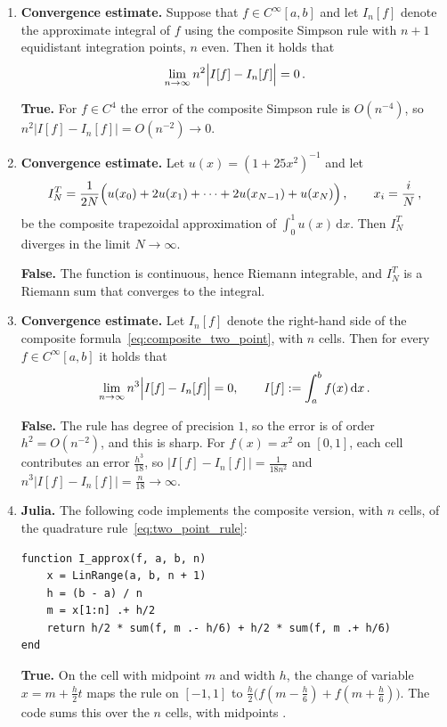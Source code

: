 \documentclass[a4paper]{article}
\renewcommand{\d}{\mathrm d}
\newcommand{\answer}[1]{%
    \ifdefined\showsolutions
        \par\smallskip
        {\small\color{blue!60!black}#1\par}
    \fi
}
\begin{document}
\begin{enumerate}
    \item
        \textbf{Convergence estimate.}
        Suppose that $f \in C^{\infty}[a, b]$ and let $I_n[f]$ denote the approximate integral of $f$ using the composite Simpson rule
        with $n+1$ equidistant integration points, $n$ even.
        Then it holds that
        \[
            \lim_{n \to \infty} n^2 \Bigl\lvert I[f] - I_n[f] \Bigr\rvert = 0\,.
        \]
        \answer{\textbf{True.}
        For $f \in C^4$ the error of the composite Simpson rule is $O(n^{-4})$, so $n^2 \lvert I[f] - I_n[f] \rvert = O(n^{-2}) \to 0$.}

    \item
        \textbf{Convergence estimate.}
        Let $u(x) = (1 + 25 x^2)^{-1}$ and let
        \[
            I^T_N = \frac{1}{2N} \Bigl( u(x_0) + 2 u(x_1) + \dotsb + 2 u(x_{N-1}) + u(x_N) \Bigr)\,, \qquad x_i = \frac{i}{N}\,,
        \]
        be the composite trapezoidal approximation of $\int_0^1 u(x) \, \d x$.
        Then $I^T_N$ diverges in the limit $N \to \infty$.
        \answer{\textbf{False.}
        The function is continuous, hence Riemann integrable, and $I^T_N$ is a Riemann sum that converges to the integral.}

    \item
        \textbf{Convergence estimate.}
        Let $I_n[f]$ denote the right-hand side of the composite formula~\eqref{eq:composite_two_point}, with $n$ cells.
        Then for every $f \in C^{\infty}[a, b]$ it holds that
        \[
            \lim_{n \to \infty} n^3 \Bigl\lvert I[f] - I_n[f] \Bigr\rvert = 0, \qquad I[f] := \int_{a}^{b} f(x) \, \d x\,.
        \]
        \answer{\textbf{False.}
        The rule has degree of precision $1$, so the error is of order $h^2 = O(n^{-2})$, and this is sharp.
        For $f(x) = x^2$ on $[0, 1]$, each cell contributes an error $\frac{h^3}{18}$, so $\lvert I[f] - I_n[f] \rvert = \frac{1}{18 n^2}$
        and $n^3 \lvert I[f] - I_n[f] \rvert = \frac{n}{18} \to \infty$.}

    \item
        \textbf{Julia.}
        The following code implements the composite version, with $n$ cells, of the quadrature rule~\eqref{eq:two_point_rule}:
        \begin{verbatim}
function I_approx(f, a, b, n)
    x = LinRange(a, b, n + 1)
    h = (b - a) / n
    m = x[1:n] .+ h/2
    return h/2 * sum(f, m .- h/6) + h/2 * sum(f, m .+ h/6)
end
        \end{verbatim}
        \answer{\textbf{True.}
        On the cell with midpoint $m$ and width $h$, the change of variable $x = m + \frac{h}{2} t$ maps the rule on $[-1, 1]$ to
        $\frac{h}{2} \bigl( f(m - \frac{h}{6}) + f(m + \frac{h}{6}) \bigr)$.
        The code sums this over the $n$ cells, with midpoints \julia{m}.}


\end{enumerate}
\end{document}

